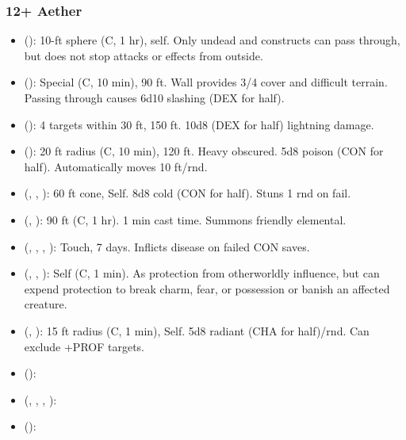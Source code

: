 \subsubsection{12+ Aether}
\begin{itemize}
	\item {} (): 10-ft sphere (C, 1 hr), self. Only undead and constructs can pass through, but does not stop attacks or effects from outside.
	\item {} (): Special (C, 10 min), 90 ft. Wall provides 3/4 cover and difficult terrain. Passing through causes 6d10 slashing (DEX for half).
	\item {} (): 4 targets within 30 ft, 150 ft. 10d8 (DEX for half) lightning damage. 
	\item {} (): 20 ft radius (C, 10 min), 120 ft. Heavy obscured. 5d8 poison (CON for half). Automatically moves 10 ft/rnd. 
	\item {} (, , ): 60 ft cone, Self. 8d8 cold (CON for half). Stuns 1 rnd on fail.
	\item {} (, ): 90 ft (C, 1 hr). 1 min cast time. Summons friendly elemental.
	\item {} (, , , ): Touch, 7 days. Inflicts disease on failed CON saves.
	\item {} (, , ): Self (C, 1 min). As protection from otherworldly influence, but can expend protection to break charm, fear, or possession or banish an affected creature.
	\item {} (, ): 15 ft radius (C, 1 min), Self. 5d8 radiant (CHA for half)/rnd. Can exclude +PROF targets.
	\item {} ():
	\item {} (, , , ):
	\item {} ():

\end{itemize}
